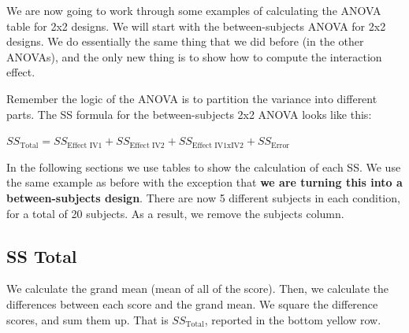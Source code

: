 \documentclass[
  letterpaper,
  DIV=11,
  numbers=noendperiod]{scrreprt}
\begin{document}
We are now going to work through some examples of calculating the ANOVA
table for 2x2 designs. We will start with the between-subjects ANOVA for
2x2 designs. We do essentially the same thing that we did before (in the
other ANOVAs), and the only new thing is to show how to compute the
interaction effect.

Remember the logic of the ANOVA is to partition the variance into
different parts. The SS formula for the between-subjects 2x2 ANOVA looks
like this:

\(SS_\text{Total} = SS_\text{Effect IV1} + SS_\text{Effect IV2} + SS_\text{Effect IV1xIV2} + SS_\text{Error}\)

In the following sections we use tables to show the calculation of each
SS. We use the same example as before with the exception that \textbf{we
are turning this into a between-subjects design}. There are now 5
different subjects in each condition, for a total of 20 subjects. As a
result, we remove the subjects column.

\subsection{SS Total}\label{ss-total-2}

We calculate the grand mean (mean of all of the score). Then, we
calculate the differences between each score and the grand mean. We
square the difference scores, and sum them up. That is
\(SS_\text{Total}\), reported in the bottom yellow row.
\end{document}
